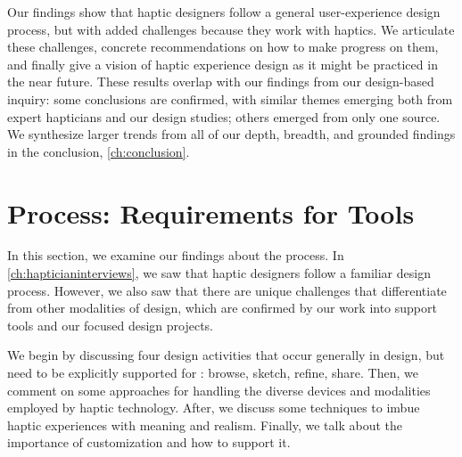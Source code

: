 Our findings show that haptic designers follow a general user-experience design process, but with added challenges because they work with haptics.
We articulate these challenges, concrete recommendations on how to make progress on them, and finally give a vision of haptic experience design as it might be practiced in the near future.
These results overlap with our findings from our design-based inquiry: some conclusions are confirmed, with similar themes emerging both from expert hapticians and our design studies; others emerged from only one source.
We synthesize larger trends from all of our depth, breadth, and grounded findings in the conclusion, \autoref{ch:conclusion}.





%
%
\section{\haxd Process: Requirements for Tools}
In this section, we examine our findings about the \haxd process. %
In \autoref{ch:hapticianinterviews}, we saw that haptic designers follow a familiar design process.
However, we also saw that there are unique challenges that differentiate \haxd from other modalities of design, which are confirmed by our work into \haxd support tools and our focused design projects.

We begin by discussing four design activities that occur generally in design, but need to be explicitly supported for \haxd: browse, sketch, refine, share.
Then, we comment on some approaches for handling the diverse devices and modalities employed by haptic technology.
After, we discuss some techniques to imbue haptic experiences with meaning and realism.
Finally, we talk about the importance of customization and how to support it.

